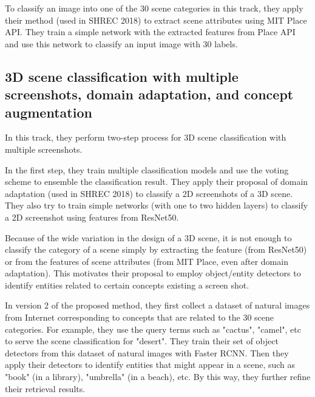 \documentclass[../main.tex]{subfiles}
\begin{document}
	
	To classify an image into one of the 30 scene categories in this track, they apply their method (used in SHREC 2018) to extract scene attributes using MIT Place API. They train a simple network with the extracted features from Place API and use this network to classify an input image with 30 labels.
	
	\subsection{3D scene classification with multiple screenshots, domain adaptation, and concept augmentation}
	
	In this track, they perform two-step process for 3D scene classification with multiple screenshots. 
	
	In the first step, they train multiple classification models and use the voting scheme to ensemble the classification result. They apply their proposal of domain adaptation (used in SHREC 2018) to classify a 2D screenshots of a 3D scene. They also try to train simple networks (with one to two hidden layers) to classify a 2D screenshot using features from ResNet50. 
	
	Because of the wide variation in the design of a 3D scene, it is not enough to classify the category of a scene simply by extracting the feature (from ResNet50) or from the features of scene attributes (from MIT Place, even after domain adaptation). This motivates their proposal to employ object/entity detectors to identify entities related to certain concepts existing a screen shot. 
	
	In version 2 of the proposed method, they first collect a dataset of natural images from Internet corresponding to concepts that are related to the 30 scene categories. For example, they use the query terms such as  "cactus", "camel", etc to serve the scene classification for "desert". They train their set of object detectors from this dataset of  natural images with Faster RCNN. Then they apply their detectors to identify  entities that might appear in a scene, such as "book" (in a library), "umbrella" (in a beach), etc. By this way, they further refine their retrieval results.
	
\end{document}
